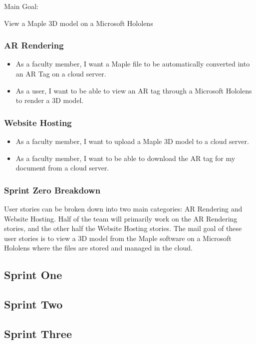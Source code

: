 Main Goal:

View a Maple 3D model on a Microsoft Hololens

\subsubsection{AR Rendering}

\begin{itemize}
	\item As a faculty member, I want a Maple file to be automatically converted into an AR Tag on a cloud server.
	\item As a user, I want to be able to view an AR tag through a Microsoft Hololens to render a 3D model.
\end{itemize}

\subsubsection{Website Hosting}

\begin{itemize}
	\item As a faculty member, I want to upload a Maple 3D model to a cloud server.
	\item As a faculty member, I want to be able to download the AR tag for my document from a cloud server.
\end{itemize}

\subsubsection{Sprint Zero Breakdown}
User stories can be broken down into two main categories: AR Rendering and Website Hosting.  Half of the team will primarily work on 
the AR Rendering stories, and the other half the Website Hosting stories.  The mail goal of these user stories is to view a
3D model from the Maple software on a Microsoft Hololens where the files are stored and managed in the cloud.

\subsection{Sprint One}

\subsection{Sprint Two}

\subsection{Sprint Three}

